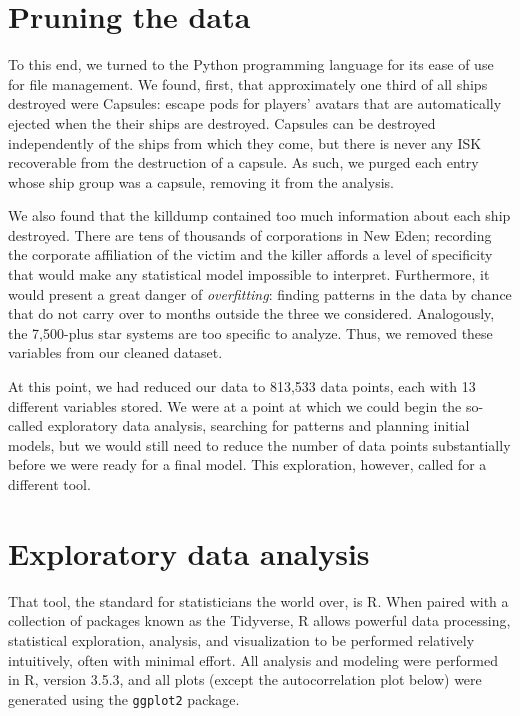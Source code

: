 \documentclass[letterpaper,12pt,article]{memoir}
\begin{document}
\section{Pruning the data}
To this end, we turned to the Python programming language \cite{python} for its
ease of use for file management. We found, first, that approximately one third 
of all ships destroyed were Capsules: escape pods for players' avatars that are
automatically ejected when the their ships are destroyed. Capsules can be
destroyed independently of the ships from which they come, but there is never 
any ISK recoverable from the destruction of a capsule. As such, we purged each
entry whose ship group was a capsule, removing it from the analysis.

We also found that the killdump contained too much information about each ship
destroyed. There are tens of thousands of corporations in New Eden; recording
the corporate affiliation of the victim and the killer affords a level of
specificity that would make any statistical model impossible to interpret.
Furthermore, it would present a great danger of \textit{overfitting}: finding
patterns  in the data by chance that do not carry over to months outside the
three we considered. Analogously, the 7,500-plus star systems are too specific 
to analyze. Thus, we removed these variables from our cleaned dataset.

At this point, we had reduced our data to 813,533 data points, each with 13
different variables stored. We were at a point at which we could begin the
so-called exploratory data analysis, searching for patterns and planning
initial models, but we would still need to reduce the number of data points
substantially before we were ready for a final model. This exploration, however,
called for a different tool.

\section{Exploratory data analysis}

That tool, the standard for statisticians the world over, is R. 
\cite{R} When paired with a collection of packages known as the Tidyverse,
\cite{tidyverse} R allows powerful data processing, statistical exploration,
analysis, and visualization to be performed relatively intuitively, often with
minimal effort. All analysis and modeling were performed in R, version 3.5.3, 
and all plots (except the autocorrelation plot below) were generated using the
\texttt{ggplot2} package. \cite{ggplot2}
\end{document}
